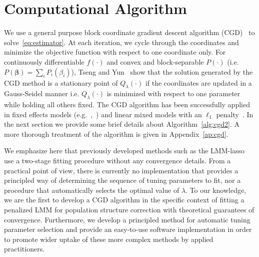 \documentclass[12pt,letter]{article}\usepackage[]{graphicx}\usepackage[]{color}
\newcommand{\bbeta}{\boldsymbol{\beta}}
\begin{document}
\section{Computational Algorithm} \label{sec:section3}


We use a general purpose block coordinate gradient descent algorithm (CGD)~\citep{tseng2009coordinate} to solve~\eqref{eq:estimator}. At each iteration, we cycle through the coordinates and minimize the objective function with respect to one coordinate only. For continuously differentiable $f(\cdot)$ and convex and block-separable $P(\cdot)$ \mbox{(i.e. $P(\bbeta) = \sum_i P_i (\beta_i)$)}, Tseng and Yun~\cite{tseng2009coordinate} show that the solution generated by the CGD method is a stationary point of $Q_{\lambda}(\cdot)$ if the coordinates are updated in a Gauss-Seidel manner i.e. $Q_{\lambda}(\cdot)$ is minimized with respect to one parameter while holding all others fixed. The CGD algorithm has been successfully applied in fixed effects models (e.g.~\cite{meier2008group},~\cite{friedman2010regularization}) and linear mixed models with an $\ell_1$ penalty~\cite{schelldorfer2011estimation}. In the next section we provide some brief details about Algorithm~\ref{alg:cgd2}. A more thorough treatment of the algorithm is given in Appendix~\ref{ap:cgd}.

We emphasize here that previously developed methods such as the LMM-lasso~\citep{rakitsch2013lasso} use a two-stage fitting procedure without any convergence details.
From a practical point of view, there is currently no implementation that provides a principled way of determining the sequence of tuning parameters to fit, nor a procedure that automatically selects the optimal value of $\lambda$.
To our knowledge, we are the first to develop a CGD algorithm in the specific context of fitting a penalized LMM for population structure correction with theoretical guarantees of convergence. Furthermore, we develop a principled method for automatic tuning parameter selection and provide an easy-to-use software implementation in order to promote wider uptake of these more complex methods by applied practitioners.
\end{document}
